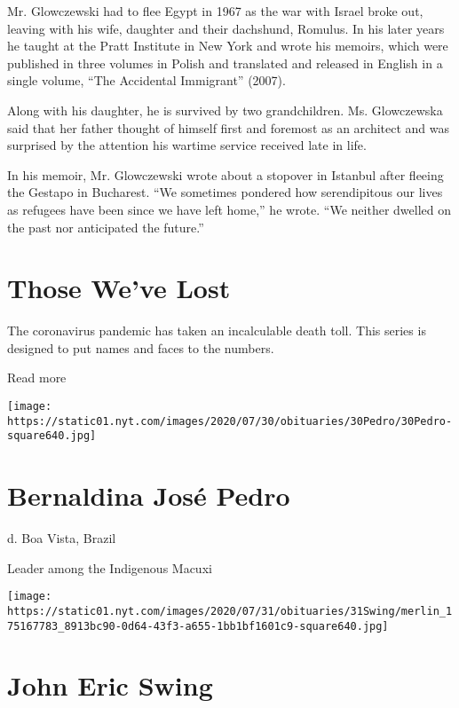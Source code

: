 Mr. Glowczewski had to flee Egypt in 1967 as the war with Israel broke
out, leaving with his wife, daughter and their dachshund, Romulus. In
his later years he taught at the Pratt Institute in New York and wrote
his memoirs, which were published in three volumes in Polish and
translated and released in English in a single volume, ``The Accidental
Immigrant'' (2007).

Along with his daughter, he is survived by two grandchildren. Ms.
Glowczewska said that her father thought of himself first and foremost
as an architect and was surprised by the attention his wartime service
received late in life.

In his memoir, Mr. Glowczewski wrote about a stopover in Istanbul after
fleeing the Gestapo in Bucharest. ``We sometimes pondered how
serendipitous our lives as refugees have been since we have left home,''
he wrote. ``We neither dwelled on the past nor anticipated the future.''

\href{https://www.nytimes.com/interactive/2020/obituaries/people-died-coronavirus-obituaries.html?action=click\&pgtype=Article\&state=default\&region=BELOW_MAIN_CONTENT\&context=covid_obits_promo}{}

\hypertarget{those-weve-lost}{%
\section{Those We've Lost}\label{those-weve-lost}}

The coronavirus pandemic has taken an incalculable death toll. This
series is designed to put names and faces to the numbers.

Read more

\texttt{[image: https://static01.nyt.com/images/2020/07/30/obituaries/30Pedro/30Pedro-square640.jpg]}

\hypertarget{bernaldina-josuxe9-pedro}{%
\section{Bernaldina José Pedro}\label{bernaldina-josuxe9-pedro}}

d. Boa Vista, Brazil

Leader among the Indigenous Macuxi

\texttt{[image: https://static01.nyt.com/images/2020/07/31/obituaries/31Swing/merlin\_175167783\_8913bc90-0d64-43f3-a655-1bb1bf1601c9-square640.jpg]}

\hypertarget{john-eric-swing}{%
\section{John Eric Swing}\label{john-eric-swing}}

